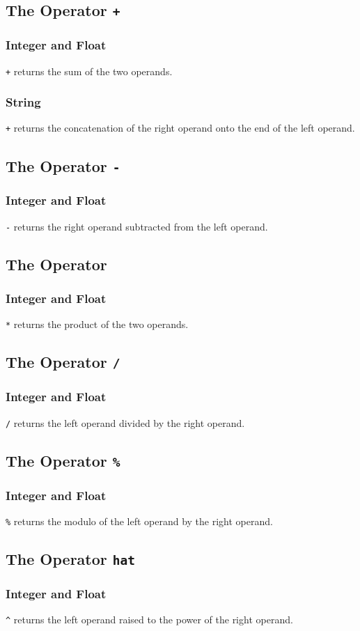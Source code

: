 \subsection{The Operator {\tt +}}
\subsubsection{Integer and Float}
\verb!+! returns the sum of the two operands.
\subsubsection{String}
\verb!+! returns the concatenation of the right operand onto the end of the left operand.

\subsection{The Operator {\tt -}}
\subsubsection{Integer and Float}
\verb!-! returns the right operand subtracted from the left operand.

\subsection{The Operator {\tt *}}
\subsubsection{Integer and Float}
\verb!*! returns the product of the two operands.

\subsection{The Operator {\tt /}}
\subsubsection{Integer and Float}
\verb!/! returns the left operand divided by the right operand.

\subsection{The Operator {\tt \%}}
\subsubsection{Integer and Float}
\verb!%! returns the modulo of the left operand by the right operand.

\subsection{The Operator {\tt hat}}
\subsubsection{Integer and Float}
\verb!^! returns the left operand raised to the power of the right operand.